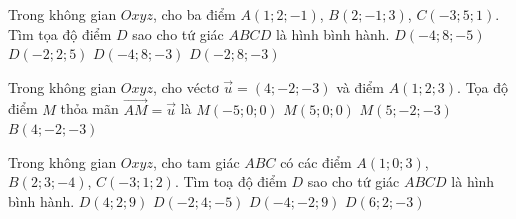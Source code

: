 \begin{ex}%
	Trong không gian $Oxyz$, cho ba điểm $A(1;2;-1)$,  $B(2;-1;3)$, $C(-3;5;1)$. Tìm tọa độ điểm $D$ sao cho tứ giác $ABCD$ là hình bình hành.
	\choice 
		{$D(-4;8;-5)$} 
		{$D(-2;2; 5)$} 
		{\True $D(-4;8;-3)$} 
		{$D(-2;8;-3)$} 
\end{ex}

\begin{ex}%
	Trong không gian $Oxyz$, cho véctơ $\overrightarrow{u}=(4;-2;-3)$ và điểm $A(1;2;3)$. Tọa độ điểm $M$  thỏa mãn $\overrightarrow{AM}=\overrightarrow{u}$ là
	\choice 
		 {$M(-5;0;0)$}
		 {\True $M(5;0;0)$}
		{$M(5;-2;-3)$} 
		{$B(4;-2;-3)$} 
\end{ex}

\begin{ex}%
	Trong không gian $Oxyz$, cho tam giác $ABC$ có  các điểm $A(1;0;3)$, $B(2;3;-4)$, $C(-3;1;2)$. Tìm toạ độ điểm $D$ sao cho tứ giác $ABCD$ là hình bình hành.
	 \choice
		 {$D(4;2;9)$}
		{$D(-2;4;-5)$} 
		{\True $D(-4;-2;9)$} 
		 {$D(6;2;-3)$}
\end{ex}

